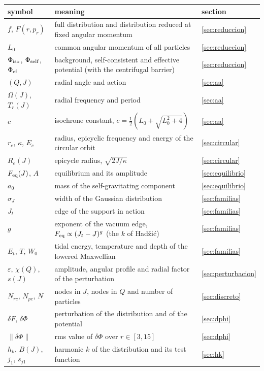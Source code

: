 \documentclass[11pt,a4paper]{article}
\begin{document}
\begin{table}[!htbp]
\centering
\small
\begin{tabular}{L{3.3cm}L{9.6cm}l}
\toprule
symbol & meaning & section\\
\midrule
$f$, $F(r,p_r)$ & full distribution and distribution reduced at fixed angular momentum & \ref{sec:reduccion}\\
$L_0$ & common angular momentum of all particles & \ref{sec:reduccion}\\
$\Phi_{\rm iso}$, $\Phi_{\rm self}$, $\Phi_{\rm ef}$ & background, self-consistent and effective potential (with the centrifugal barrier) & \ref{sec:reduccion}\\
$(Q,J)$ & radial angle and action & \ref{sec:aa}\\
$\Omega(J)$, $T_r(J)$ & radial frequency and period & \ref{sec:aa}\\
$c$ & isochrone constant, $c=\tfrac12(L_0+\sqrt{L_0^2+4})$ & \ref{sec:aa}\\
$r_c$, $\kappa$, $E_c$ & radius, epicyclic frequency and energy of the circular orbit & \ref{sec:circular}\\
$R_e(J)$ & epicycle radius, $\sqrt{2J/\kappa}$ & \ref{sec:circular}\\
$F_{\rm eq}(J)$, $A$ & equilibrium and its amplitude & \ref{sec:equilibrio}\\
$a_0$ & mass of the self-gravitating component & \ref{sec:equilibrio}\\
$\sigma_J$ & width of the Gaussian distribution & \ref{sec:familias}\\
$J_t$ & edge of the support in action & \ref{sec:familias}\\
$g$ & exponent of the vacuum edge, $F_{\rm eq}\propto(J_t-J)^g$ (the $k$ of Hadžić) & \ref{sec:familias}\\
$E_t$, $T$, $W_0$ & tidal energy, temperature and depth of the lowered Maxwellian & \ref{sec:familias}\\
$\varepsilon$, $\chi(Q)$, $s(J)$ & amplitude, angular profile and radial factor of the perturbation & \ref{sec:perturbacion}\\
$N_{rc}$, $N_{pc}$, $N$ & nodes in $J$, nodes in $Q$ and number of particles & \ref{sec:discreto}\\
\midrule
$\delta F$, $\delta\Phi$ & perturbation of the distribution and of the potential & \ref{sec:dphi}\\
$\|\delta\Phi\|$ & rms value of $\delta\Phi$ over $r\in[3,15]$ & \ref{sec:dphi}\\
$h_k$, $B(J)$, $j_1$, $s_{j1}$ & harmonic $k$ of the distribution and its test function & \ref{sec:hk}\\

\end{tabular}
\end{table}
\end{document}
